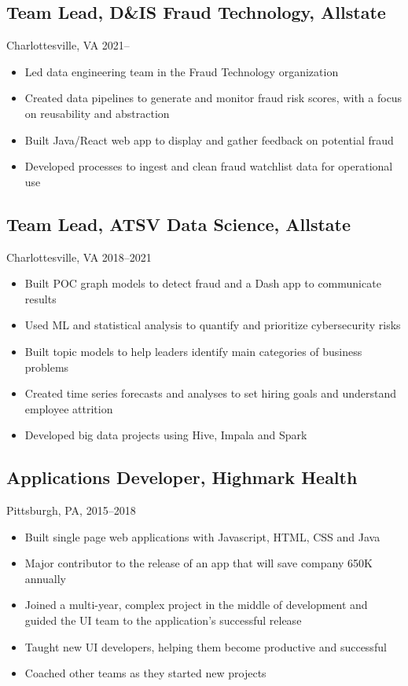 \documentclass[11pt]{article}
\begin{document}
	\subsection{\normalsize{Team Lead, D\&IS Fraud Technology, Allstate}}
	{\fontsize{10pt}{\parskip}\selectfont Charlottesville, VA 2021--}
	\begin{itemize}
	\item Led data engineering team in the Fraud Technology organization
	\item Created data pipelines to generate and monitor fraud risk scores, \newline with a focus on reusability and abstraction
	\item Built Java/React web app to display and gather feedback on potential fraud
	\item Developed processes to ingest and clean fraud watchlist data for operational use
	\end{itemize}


	\subsection{\normalsize{Team Lead, ATSV Data Science, Allstate}}
	{\fontsize{10pt}{\parskip}\selectfont Charlottesville, VA 2018--2021}
	\begin{itemize}
  \item Built POC graph models to detect fraud and a Dash app to communicate results
	\item Used ML and statistical analysis to quantify and prioritize cybersecurity risks
	\item Built topic models to help leaders identify main categories of business problems
	\item Created time series forecasts and analyses to set hiring goals  \newline and understand employee attrition
	\item Developed big data projects using Hive, Impala and Spark
	\end{itemize}

	\subsection{\normalsize{Applications Developer, Highmark Health}}
		{\fontsize{10pt}{\parskip}\selectfont Pittsburgh, PA, 2015--2018}
		\begin{itemize}
		\item Built single page web applications with Javascript, HTML, CSS and Java
		\item Major contributor to the release of an app that will save company 650K annually
		\item Joined a multi-year, complex project in the middle of development and guided the UI team to the application's successful release
		\item Taught new UI developers, helping them become productive and successful
		\item Coached other teams as they started new projects
		\end{itemize}
\end{document}
